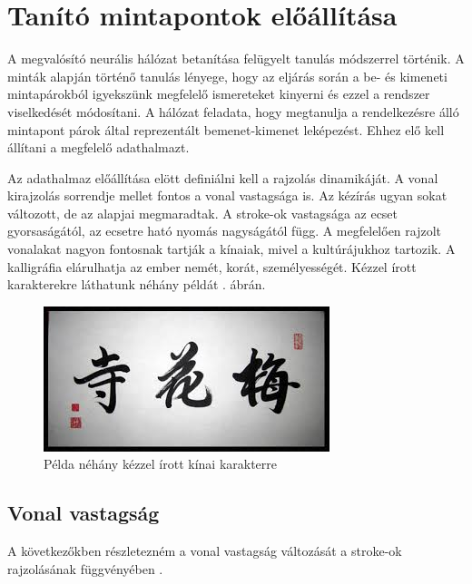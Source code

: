 
\section{Tanító mintapontok előállítása}

A megvalósító neurális hálózat betanítása felügyelt tanulás módszerrel történik. A minták alapján történő tanulás lényege, hogy az eljárás során a be- és kimeneti mintapárokból igyekszünk megfelelő ismereteket kinyerni és ezzel a rendszer viselkedését módosítani. A hálózat feladata, hogy megtanulja a rendelkezésre álló mintapont párok által reprezentált bemenet-kimenet leképezést. Ehhez elő kell állítani a megfelelő adathalmazt.

Az adathalmaz előállítása elött definiálni kell a rajzolás dinamikáját. A vonal kirajzolás sorrendje mellet fontos a vonal vastagsága is. Az kézírás ugyan sokat változott, de az alapjai megmaradtak. A stroke-ok vastagsága az ecset gyorsaságától, az ecsetre ható nyomás nagyságától függ. A megfelelően rajzolt vonalakat nagyon fontosnak tartják a kínaiak, mivel a kultúrájukhoz tartozik. A kalligráfia elárulhatja az ember nemét, korát, személyességét. Kézzel írott karakterekre láthatunk néhány példát . ábrán.

\begin{figure}[h]
\centering
\includegraphics[scale=0.8]{images/calligraphy}
\caption{Példa néhány kézzel írott kínai karakterre}
\label{fig:calligraphy}
\end{figure}

\subsection{Vonal vastagság}

A következőkben részletezném a vonal vastagság változását a stroke-ok rajzolásának függvényében \cite{StrokeCJ9}. 

